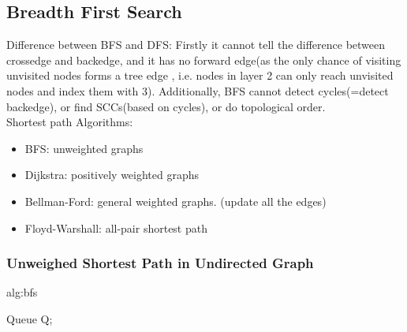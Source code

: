 \subsection{Breadth First Search}
Difference between BFS and DFS:
Firstly it cannot tell the difference between crossedge and backedge, and it has no forward edge(as the only chance of visiting unvisited nodes forms a tree edge
, i.e. nodes in layer 2 can only reach unvisited nodes and index them with 3).
Additionally, BFS cannot detect cycles(=detect backedge), or find SCCs(based on cycles), or do topological order.\\
Shortest path Algorithms:
\begin{itemize}
    \item BFS: unweighted graphs
    \item Dijkstra: positively weighted graphs
    \item Bellman-Ford: general weighted graphs. (update all the edges)
    \item Floyd-Warshall: all-pair shortest path
\end{itemize}
\subsubsection{Unweighed Shortest Path in Undirected Graph}
\begin{algorithm}
    \caption{alg:bfs}
    \label{Naive BFS}
    Queue Q;\\
\end{algorithm}




